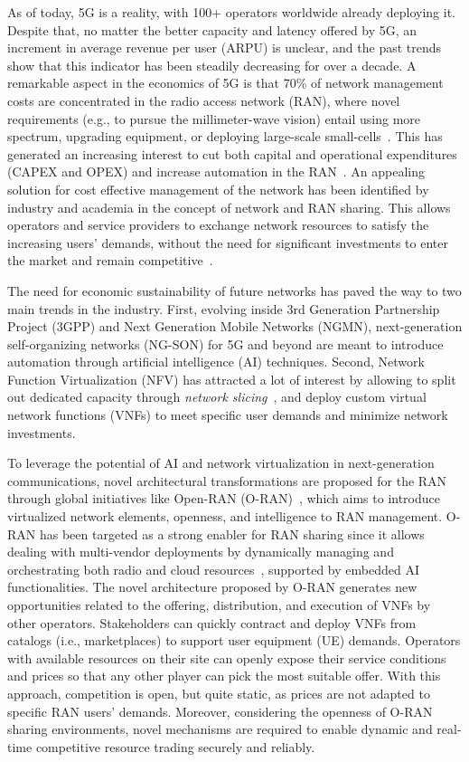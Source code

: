 \documentclass[journal]{IEEEtran}
\begin{document}
	As of today, 5G is a reality, with 100+ operators worldwide already deploying it. Despite that, no matter the better capacity and latency offered by 5G, an increment in average revenue per user (ARPU) is unclear, and the past trends show that this indicator has been steadily decreasing for over a decade. A remarkable aspect in the economics of 5G is that 70\% of network management costs are concentrated in the radio access network (RAN), where novel requirements (e.g., to pursue the millimeter-wave vision) entail using more spectrum, upgrading equipment, or deploying large-scale small-cells~\cite{webb20185g}. This has generated an increasing interest to cut both capital and operational expenditures (CAPEX and OPEX) and increase automation in the RAN~\cite{ORANall}. An appealing solution for cost effective management of the network has been identified by industry and academia in the concept of network and RAN sharing. This allows operators and service providers to exchange network resources to satisfy the increasing users' demands, without the need for significant investments to enter the market and remain competitive~\cite{samdanis2016network}.
	
	The need for economic sustainability of future networks has paved the way to two main trends in the industry. First, evolving inside 3rd Generation Partnership Project (3GPP) and Next Generation Mobile Networks (NGMN), next-generation self-organizing networks (NG-SON) for 5G and beyond are meant to introduce automation through artificial intelligence (AI) techniques. Second, Network Function Virtualization (NFV) has attracted a lot of interest by allowing to split out dedicated capacity through \textit{network slicing}~\cite{foukas2017network}, and deploy custom virtual network functions (VNFs) to meet specific user demands and minimize network investments. 
	
	To leverage the potential of AI and network virtualization in next-generation communications, novel architectural transformations are proposed for the RAN through global initiatives like Open-RAN (O-RAN)~\cite{ORANall}, which aims to introduce virtualized network elements, openness, and intelligence to RAN management. O-RAN has been targeted as a strong enabler for RAN sharing since it allows dealing with multi-vendor deployments by dynamically managing and orchestrating both radio and cloud resources~\cite{ORANall}, supported by embedded AI functionalities. The novel architecture proposed by O-RAN generates new opportunities related to the offering, distribution, and execution of VNFs by other operators. Stakeholders can quickly contract and deploy VNFs from catalogs (i.e., marketplaces) to support user equipment (UE) demands. Operators with available resources on their site can openly expose their service conditions and prices so that any other player can pick the most suitable offer. With this approach, competition is open, but quite static, as prices are not adapted to specific RAN users' demands. Moreover, considering the openness of O-RAN sharing environments, novel mechanisms are required to enable dynamic and real-time competitive resource trading securely and reliably.
	
\end{document}
